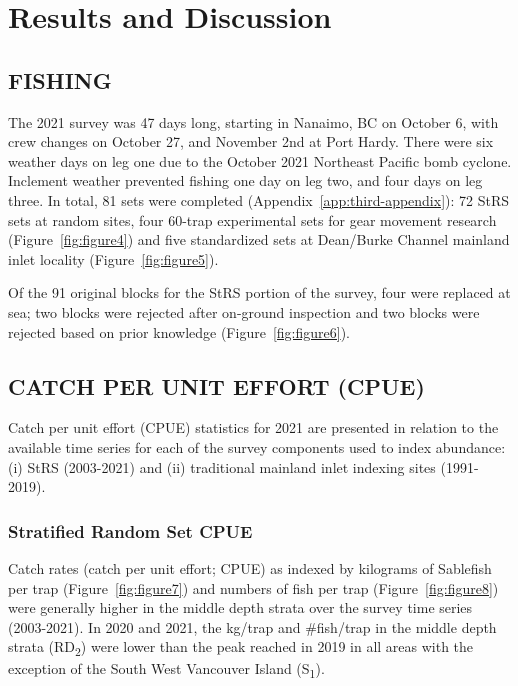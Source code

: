 \documentclass[12pt]{article}\usepackage[]{graphicx}\usepackage[]{color}
\begin{document}
\hypertarget{results-and-discussion}{%
\section{Results and Discussion}\label{results-and-discussion}}

\hypertarget{fishing}{%
\subsection{FISHING}\label{fishing}}

The 2021 survey was 47 days long, starting in Nanaimo, BC on October 6, with crew changes on October 27, and November 2nd at Port Hardy. There were six weather days on leg one due to the October 2021 Northeast Pacific bomb cyclone. Inclement weather prevented fishing one day on leg two, and four days on leg three. In total, 81 sets were completed (Appendix~\ref{app:third-appendix}): 72 StRS sets at random sites, four 60-trap experimental sets for gear movement research (Figure~\ref{fig:figure4}) and five standardized sets at Dean/Burke Channel mainland inlet locality (Figure~\ref{fig:figure5}).

Of the 91 original blocks for the StRS portion of the survey, four were replaced at sea; two blocks were rejected after on-ground inspection and two blocks were rejected based on prior knowledge (Figure~\ref{fig:figure6}).

\hypertarget{catch-per-unit-effort-cpue}{%
\subsection{CATCH PER UNIT EFFORT (CPUE)}\label{catch-per-unit-effort-cpue}}

Catch per unit effort (CPUE) statistics for 2021 are presented in relation to the available time series for each of the survey components used to index abundance: (i) StRS (2003-2021) and (ii) traditional mainland inlet indexing sites (1991-2019).

\hypertarget{stratified-random-set-cpue}{%
\subsubsection{Stratified Random Set CPUE}\label{stratified-random-set-cpue}}

Catch rates (catch per unit effort; CPUE) as indexed by kilograms of Sablefish per trap (Figure~\ref{fig:figure7}) and numbers of fish per trap (Figure~\ref{fig:figure8}) were generally higher in the middle depth strata over the survey time series (2003-2021). In 2020 and 2021, the kg/trap and \#fish/trap in the middle depth strata (RD\textsubscript{2}) were lower than the peak reached in 2019 in all areas with the exception of the South West Vancouver Island (S\textsubscript{1}).
\end{document}

